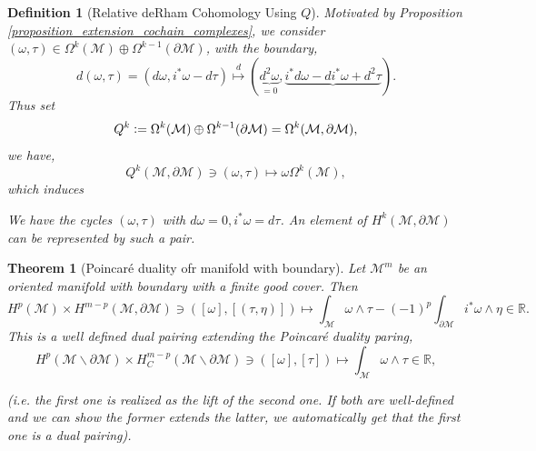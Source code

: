 \documentclass[8pt]{article}
\newtheorem{theorem}{Theorem} [section]
\newtheorem{definition}{Definition}[section]
\newcommand{\defeq}{\vcentcolon=}
\newcommand{\R}[0]{\mathbb{R}}
\newcommand{\M}[0]{\mathcal{M}}
\begin{document}
\begin{definition}[Relative deRham Cohomology Using $Q$]
  Motivated by Proposition \ref{proposition_extension_cochain_complexes}, we consider $(\omega,\tau)\in\Omega^k(\M)\oplus\Omega^{k-1}(\partial\M)$, with the boundary,
  \begin{equation*}
    d(\omega,\tau) = (d\omega,i^*\omega-d\tau) \stackrel{d}{\mapsto}(\underbrace{d^2\omega}_{=0},\underbrace{i^*d\omega-di^*\omega+d^2\tau}).
  \end{equation*}
  Thus set 
  \begin{equation*}
    Q^k \defeq\Omega^k(\M)\oplus\Omega^{k-1}(\partial\M)=\Omega^k(\M,\partial\M),
  \end{equation*}
  we have,
  \begin{equation*}
    Q^k(\M,\partial\M)\ni(\omega,\tau)\mapsto\omega\Omega^k(\M),
  \end{equation*}
  which induces 
  \begin{center}
  \end{center}
  We have the cycles $(\omega,\tau)$ with $d\omega=0,i^*\omega=d\tau$. An element of $H^k(\M,\partial\M)$ can be represented by such a pair.
\end{definition}
\begin{theorem}[Poincaré duality ofr manifold with boundary]
  Let $\M^m$ be an oriented manifold with boundary with a finite good cover. Then 
  \begin{equation*}
    H^p(\M)\times H^{m-p}(\M,\partial\M)\ni([\omega],[(\tau,\eta)])\longmapsto\int_\M\omega\wedge\tau-(-1)^p\int_{\partial\M}i^*\omega\wedge\eta\in\R.
  \end{equation*}
  This is a well defined dual pairing extending the Poincaré duality paring,
  \begin{equation*}
    H^p(\M\backslash\partial\M)\times H_C^{m-p}(\M\backslash\partial\M)\ni([\omega],[\tau])\mapsto\int_\M\omega\wedge\tau\in\R,
  \end{equation*}
  \begin{center}
  \end{center}
  (i.e. the first one is realized as the lift of the second one. If both are well-defined and we can show the former extends the latter, we automatically get that the first one is a dual pairing).
\end{theorem}
\end{document}
